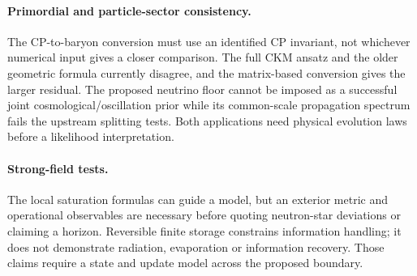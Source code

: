 \paragraph{Primordial and particle-sector consistency.}
The CP-to-baryon conversion must use an identified CP invariant, not whichever numerical input gives a closer comparison. The full CKM ansatz and the older geometric formula currently disagree, and the matrix-based conversion gives the larger residual. The proposed neutrino floor cannot be imposed as a successful joint cosmological/oscillation prior while its common-scale propagation spectrum fails the upstream splitting tests. Both applications need physical evolution laws before a likelihood interpretation.

\paragraph{Strong-field tests.}
The local saturation formulas can guide a model, but an exterior metric and operational observables are necessary before quoting neutron-star deviations or claiming a horizon. Reversible finite storage constrains information handling; it does not demonstrate radiation, evaporation or information recovery. Those claims require a state and update model across the proposed boundary.
